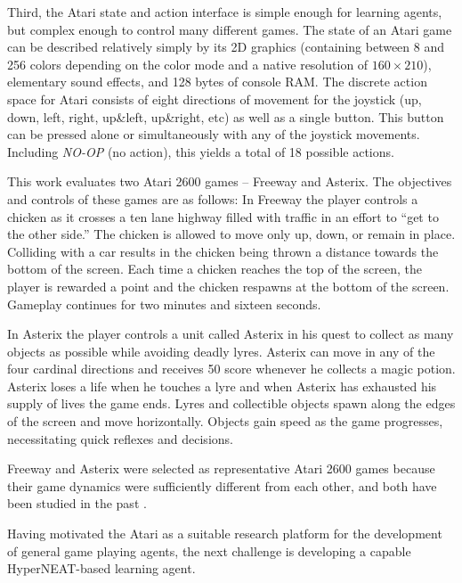 \documentclass{sig-alternate}
\begin{document}
Third, the Atari state and action interface is simple enough for learning agents, but complex enough to control many different games. The state of an Atari game can be described relatively simply by its 2D graphics (containing between 8 and 256 colors depending on the color mode and a native resolution of $160\times 210$), elementary sound effects, and 128 bytes of console RAM. The discrete action space for Atari consists of eight directions of movement for the joystick (up, down, left, right, up\&left, up\&right, etc) as well as a single button. This button can be pressed alone or simultaneously with any of the joystick movements. Including \textit{NO-OP} (no action), this yields a total of 18 possible actions. 

This work evaluates two Atari 2600 games -- Freeway and Asterix. The objectives and controls of these games are as follows: In Freeway the player controls a chicken as it crosses a ten lane highway filled with traffic in an effort to ``get to the other side.'' The chicken is allowed to move only up, down, or remain in place. Colliding with a car results in the chicken being thrown a distance towards the bottom of the screen. Each time a chicken reaches the top of the screen, the player is rewarded a point and the chicken respawns at the bottom of the screen. Gameplay continues for two minutes and sixteen seconds. 

In Asterix the player controls a unit called Asterix in his quest to collect as many objects as possible while avoiding deadly lyres. Asterix can move in any of the four cardinal directions and receives 50 score whenever he collects a magic potion. Asterix loses a life when he touches a lyre and when Asterix has exhausted his supply of lives the game ends. Lyres and collectible objects spawn along the edges of the screen and move horizontally. Objects gain speed as the game progresses, necessitating quick reflexes and decisions.

Freeway and Asterix were selected as representative Atari 2600 games because their game dynamics were sufficiently different from each other, and both have been studied in the past \cite{naddaf10}. 

Having motivated the Atari as a suitable research platform for the development of general game playing agents, the next challenge is developing a capable HyperNEAT-based learning agent.
\end{document}
